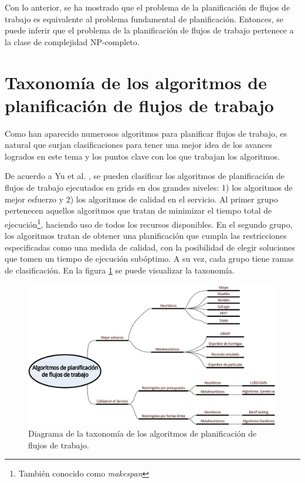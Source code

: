 Con lo anterior, se ha mostrado que el problema de la planificación de flujos de trabajo es equivalente al problema fundamental de planificación. Entonces, se puede inferir que el problema de la planificación de flujos de trabajo pertenece a la clase de complejidad NP-completo.



\section{Taxonomía de los algoritmos de planificación de flujos de trabajo}
\label{secc:taxonomy}

Como han aparecido numerosos algoritmos para planificar flujos de trabajo, es natural que surjan clasificaciones \cite{topcuoglu2002performance} \cite{yu2008workflow} para tener una mejor idea de los avances logrados en este tema y los puntos clave con los que trabajan los algoritmos.

De acuerdo a Yu et al. \cite{yu2008workflow}, se pueden clasificar los algoritmos de planificación de flujos de trabajo ejecutados en grids en dos grandes niveles: 1) los algoritmos de mejor esfuerzo y 2) los algoritmos de calidad en el servicio. Al primer grupo pertenecen aquellos algoritmos que tratan de minimizar el tiempo total de ejecución\footnote{También conocido como \emph{makespan}}, haciendo uso de todos los recursos disponibles. En el segundo grupo, los algoritmos tratan de obtener una planificación que cumpla las restricciones especificadas como una medida de calidad, con la posibilidad de elegir soluciones que tomen un tiempo de ejecución subóptimo. A su vez, cada grupo tiene ramas de clasificación. En la figura \ref{fig:taxonomy} se puede visualizar la taxonomía.

\begin{figure}
\begin{center}
\includegraphics[width=1.0\textwidth]{imagenes/taxonomy}
\end{center}
\caption{Diagrama de la taxonomía de los algoritmos de planificación de flujos de trabajo.}
\label{fig:taxonomy}
\end{figure}

